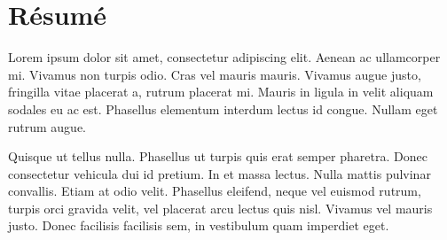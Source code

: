 \chapter*{Résumé}

Lorem ipsum dolor sit amet, consectetur adipiscing elit. Aenean ac
ullamcorper mi. Vivamus non turpis odio. Cras vel mauris mauris. Vivamus
augue justo, fringilla vitae placerat a, rutrum placerat mi. Mauris in
ligula in velit aliquam sodales eu ac est. Phasellus elementum interdum
lectus id congue. Nullam eget rutrum augue.

Quisque ut tellus nulla. Phasellus ut turpis quis erat semper pharetra.
Donec consectetur vehicula dui id pretium. In et massa lectus. Nulla mattis
pulvinar convallis. Etiam at odio velit. Phasellus eleifend, neque vel
euismod rutrum, turpis orci gravida velit, vel placerat arcu lectus quis
nisl. Vivamus vel mauris justo. Donec facilisis facilisis sem, in vestibulum
quam imperdiet eget.
